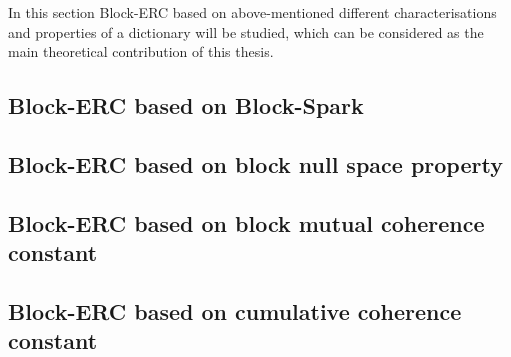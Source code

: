 In this section Block-ERC based on above-mentioned different characterisations and properties of a dictionary will be studied, which can be considered as the main theoretical contribution of this thesis.
\subsection{Block-ERC based on Block-Spark}
\label{sec:BERC-BS} 

\newpage
\subsection{Block-ERC based on block null space property}
\label{sec:BERC_BNSP} 

\newpage
\subsection{Block-ERC based on block mutual coherence constant}

\newpage
\subsection{Block-ERC based on cumulative coherence constant}
